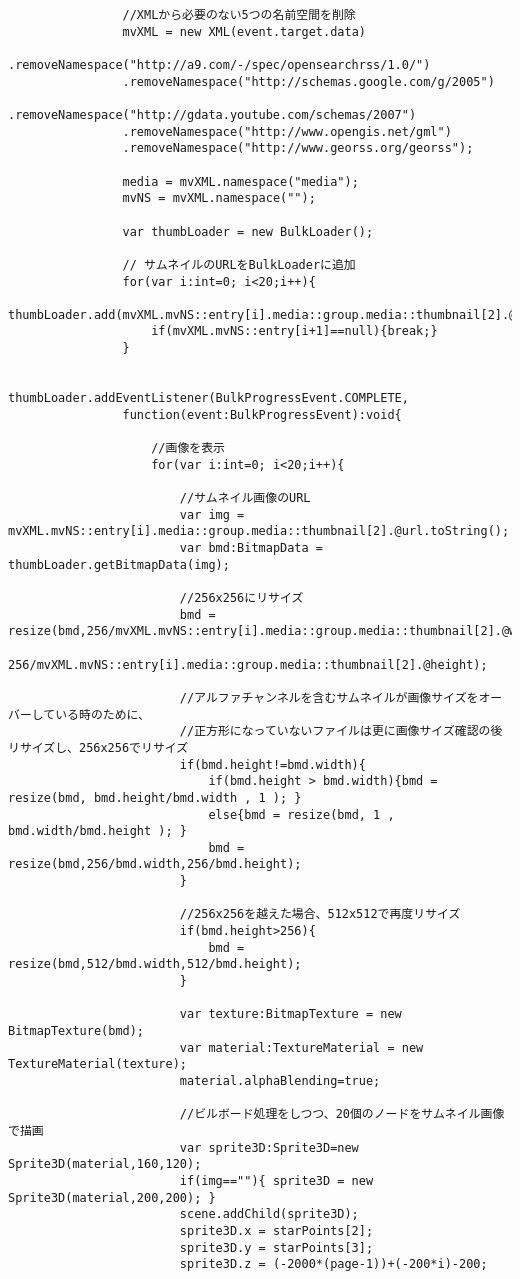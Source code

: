 {\begin{verbatim}
				//XMLから必要のない5つの名前空間を削除
				mvXML = new XML(event.target.data)
				.removeNamespace("http://a9.com/-/spec/opensearchrss/1.0/")
				.removeNamespace("http://schemas.google.com/g/2005")
				.removeNamespace("http://gdata.youtube.com/schemas/2007")
				.removeNamespace("http://www.opengis.net/gml")
				.removeNamespace("http://www.georss.org/georss");
				
				media = mvXML.namespace("media");
				mvNS = mvXML.namespace("");
				
				var thumbLoader = new BulkLoader();
				
				// サムネイルのURLをBulkLoaderに追加
				for(var i:int=0; i<20;i++){
					thumbLoader.add(mvXML.mvNS::entry[i].media::group.media::thumbnail[2].@url.toString());
					if(mvXML.mvNS::entry[i+1]==null){break;}
				}
				
				thumbLoader.addEventListener(BulkProgressEvent.COMPLETE,
				function(event:BulkProgressEvent):void{
					
					//画像を表示
					for(var i:int=0; i<20;i++){
					
						//サムネイル画像のURL
						var img = mvXML.mvNS::entry[i].media::group.media::thumbnail[2].@url.toString();
						var bmd:BitmapData = thumbLoader.getBitmapData(img);
						
						//256x256にリサイズ
						bmd = resize(bmd,256/mvXML.mvNS::entry[i].media::group.media::thumbnail[2].@width,
									 	 256/mvXML.mvNS::entry[i].media::group.media::thumbnail[2].@height);
									 
						//アルファチャンネルを含むサムネイルが画像サイズをオーバーしている時のために、
						//正方形になっていないファイルは更に画像サイズ確認の後リサイズし、256x256でリサイズ
						if(bmd.height!=bmd.width){
							if(bmd.height > bmd.width){bmd = resize(bmd, bmd.height/bmd.width , 1 ); }
							else{bmd = resize(bmd, 1 , bmd.width/bmd.height ); }
							bmd = resize(bmd,256/bmd.width,256/bmd.height);
						}
						
						//256x256を越えた場合、512x512で再度リサイズ
						if(bmd.height>256){
							bmd = resize(bmd,512/bmd.width,512/bmd.height);
						}
						
						var texture:BitmapTexture = new BitmapTexture(bmd);
						var material:TextureMaterial = new TextureMaterial(texture);
						material.alphaBlending=true;
						
						//ビルボード処理をしつつ、20個のノードをサムネイル画像で描画
						var sprite3D:Sprite3D=new Sprite3D(material,160,120);
						if(img==""){ sprite3D = new Sprite3D(material,200,200); }
						scene.addChild(sprite3D);
						sprite3D.x = starPoints[2];
						sprite3D.y = starPoints[3];
						sprite3D.z = (-2000*(page-1))+(-200*i)-200;
						

\end{verbatim}}
